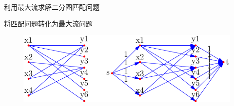 \documentclass[UTF8]{ctexbeamer}
\begin{document}
\begin{frame}{利用最大流求解二分图匹配问题}
  \begin{block}{}
    将匹配问题转化为最大流问题
  \end{block}

  \begin{figure}
    \includegraphics[width=.8\textwidth]{maxmatch-arrow.pdf}
  \end{figure}
\end{frame}
\end{document}
